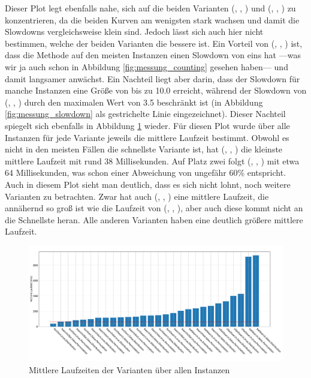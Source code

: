 Dieser Plot legt ebenfalls nahe, sich auf die beiden Varianten (\SeaUSet, \false, \perm) und 
(\SorSor, \true, \distr) zu konzentrieren, da die beiden Kurven am wenigsten stark wachsen und damit 
die Slowdowns vergleichsweise klein sind. Jedoch lässt sich auch hier nicht bestimmen, welche der beiden
Varianten die bessere ist. Ein Vorteil von (\SeaUSet, \false, \perm) ist, 
dass die Methode auf den meisten Instanzen einen Slowdown
von eins hat ---was wir ja auch schon in Abbildung \ref{fig:messung_counting} gesehen haben---
und damit langsamer anwächst. Ein Nachteil liegt aber darin, dass der Slowdown für manche Instanzen
eine Größe von bis zu 10.0 erreicht, während der Slowdown von  (\SorSor, \true, \distr) durch den maximalen
Wert von 3.5 beschränkt ist (in Abbildung \ref{fig:messung_slowdown} als gestrichelte Linie eingezeichnet).
\newpage
Dieser Nachteil spiegelt sich ebenfalls in Abbildung \ref{fig:messung_mean} wieder. Für diesen Plot
wurde über alle Instanzen für jede Variante jeweils die mittlere Laufzeit bestimmt. Obwohl
es nicht in den meisten Fällen die schnellste Variante ist, hat (\SorSor, \true, \distr) die 
kleinste mittlere Laufzeit mit rund 38 Millisekunden. Auf Platz zwei folgt
(\SeaUSet, \false, \perm) mit etwa 64 Millisekunden, was schon einer Abweichung von ungefähr 60\% entspricht.
Auch in diesem Plot sieht man deutlich, dass es sich nicht lohnt, noch weitere Varianten zu betrachten. Zwar hat 
auch (\SorSor, \true, \perm) eine mittlere Laufzeit, 
die annähernd so groß ist wie die Laufzeit von (\SeaUSet, \false, \perm), aber 
auch diese kommt nicht an die Schnellste heran. Alle anderen Varianten 
haben eine deutlich größere mittlere Laufzeit.
\begin{figure}
\centering
	\includegraphics[width = \textwidth]{figures/mean.pdf}
	\caption{Mittlere Laufzeiten der Varianten über allen Instanzen}
	\label{fig:messung_mean}
\end{figure}
\\

